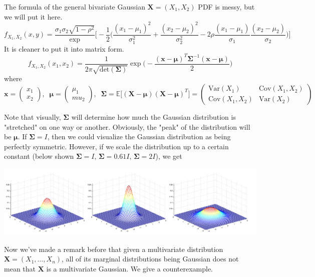 \documentclass{article}
\theoremstyle{definition}
\theoremstyle{remark}
\theoremstyle{definition}
\begin{document}
The formula of the general bivariate Gaussian $\mathbf{X} = (X_1, X_2)$ PDF is messy, but we will put it here. 
\[f_{X_1, X_2} (x, y) = \frac{\sigma_1 \sigma_2 \sqrt{1 - \rho^2}} \exp \bigg[ -\frac{1}{2} \bigg( \frac{(x_1 - \mu_1)^2}{\sigma_1^2} + \frac{(x_2 - \mu_2)^2}{\sigma_2^2} - 2 \rho \frac{(x_1 - \mu_1)}{\sigma_1} \frac{(x_2 - \mu_2)}{\sigma_2}\bigg)\bigg]\]
It is cleaner to put it into matrix form. 
\[f_{X_1, X_2} (x_1 , x_2) = \frac{1}{2 \pi \sqrt{\mathrm{det}(\boldsymbol{\Sigma})}} \exp \bigg( - \frac{(\mathbf{x} - \boldsymbol{\mu})^T \boldsymbol{\Sigma}^{-1} (\mathbf{x} - \boldsymbol{\mu})}{2} \bigg) \]
where 
\[\mathbf{x} = \begin{pmatrix} x_1 \\ x_2 \end{pmatrix}, \;\; \boldsymbol{\mu} = \begin{pmatrix} \mu_1 \\ mu_2 \end{pmatrix} , \;\; \boldsymbol{\Sigma} = \mathbb{E}\big[ (\mathbf{X} - \boldsymbol{\mu}) (\mathbf{X} - \boldsymbol{\mu})^T \big] = \begin{pmatrix} \mathrm{Var}(X_1) & \mathrm{Cov}(X_1, X_2) \\
\mathrm{Cov}(X_1, X_2) & \mathrm{Var}(X_2) \end{pmatrix}\]

Note that visually, $\boldsymbol{\Sigma}$ will determine how much the Gaussian distribution is "stretched" on one way or another. Obviously, the "peak" of the distribution will be $\boldsymbol{\mu}$. If $\boldsymbol{\Sigma} = I$, then we could visualize the Gaussian distribution as being perfectly symmetric. However, if we scale the distribution up to a certain constant (below shown $\boldsymbol{\Sigma} = I$, $\boldsymbol{\Sigma} = 0.61 I$, $\boldsymbol{\Sigma} = 2 I$), we get
\begin{center}
    \includegraphics[scale=0.65]{img/Gaussian_Distribution.png}
\end{center}

Now we've made a remark before that given a multivariate distribution $\mathbf{X} = (X_1, \ldots, X_n)$, all of its marginal distributions being Gaussian does not mean that $\mathbf{X}$ is a multivariate Gaussian. We give a counterexample. 
\end{document}

